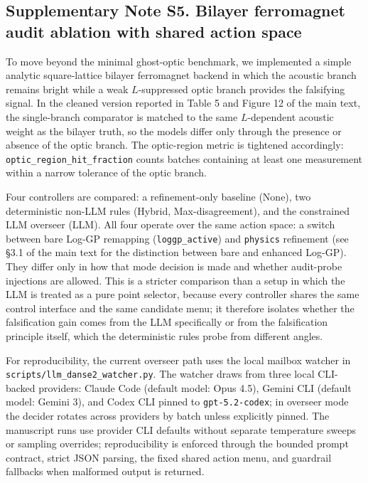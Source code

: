 \documentclass[
]{article}
\begin{document}
\hypertarget{supplementary-note-s5.-bilayer-ferromagnet-audit-ablation-with-shared-action-space}{%
\subsection{Supplementary Note S5. Bilayer ferromagnet audit ablation
with shared action
space}\label{supplementary-note-s5.-bilayer-ferromagnet-audit-ablation-with-shared-action-space}}

To move beyond the minimal ghost-optic benchmark, we implemented a
simple analytic square-lattice bilayer ferromagnet backend in which the
acoustic branch remains bright while a weak \(L\)-suppressed optic
branch provides the falsifying signal. In the cleaned version reported
in Table 5 and Figure 12 of the main text, the single-branch comparator
is matched to the same \(L\)-dependent acoustic weight as the bilayer
truth, so the models differ only through the presence or absence of the
optic branch. The optic-region metric is tightened accordingly:
\texttt{optic\_region\_hit\_fraction} counts batches containing at least
one measurement within a narrow tolerance of the optic branch.

Four controllers are compared: a refinement-only baseline (None), two
deterministic non-LLM rules (Hybrid, Max-disagreement), and the
constrained LLM overseer (LLM). All four operate over the same action
space: a switch between bare Log-GP remapping (\texttt{loggp\_active})
and \texttt{physics} refinement (see §3.1 of the main text for the
distinction between bare and enhanced Log-GP). They differ only in how
that mode decision is made and whether audit-probe injections are
allowed. This is a stricter comparison than a setup in which the LLM is
treated as a pure point selector, because every controller shares the
same control interface and the same candidate menu; it therefore
isolates whether the falsification gain comes from the LLM specifically
or from the falsification principle itself, which the deterministic
rules probe from different angles.

For reproducibility, the current overseer path uses the local mailbox
watcher in \texttt{scripts/llm\_danse2\_watcher.py}. The watcher draws
from three local CLI-backed providers: Claude Code (default model: Opus
4.5), Gemini CLI (default model: Gemini 3), and Codex CLI pinned to
\texttt{gpt-5.2-codex}; in overseer mode the decider rotates across
providers by batch unless explicitly pinned. The manuscript runs use
provider CLI defaults without separate temperature sweeps or sampling
overrides; reproducibility is enforced through the bounded prompt
contract, strict JSON parsing, the fixed shared action menu, and
guardrail fallbacks when malformed output is returned.
\end{document}
